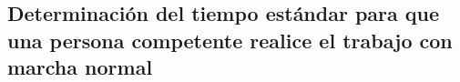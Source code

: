 %
\subsection{Determinación del tiempo estándar para que una persona competente realice el trabajo con marcha normal}

% 
% 

% 
% 
% 
% 
% 
% 



